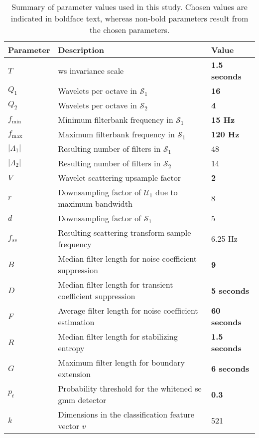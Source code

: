 {\begin{subappendices}
    \begin{table}[h]
        \caption{Summary of parameter values used in this study. Chosen values are indicated in boldface text, whereas non-bold parameters result from the chosen parameters.}
        \label{tab:parameters}
            \renewcommand{\arraystretch}{0.8}%
            \begin{tabular}{lll}  \small
                \textbf{Parameter}      & \textbf{Description} & \textbf{Value} \\ \hline
                $T$ & \ac{ws} invariance scale & \textbf{1.5 seconds} \\
                $Q_1$ & Wavelets per octave in $\mathcal{S}_1$ & \textbf{16} \\
                $Q_2$ & Wavelets per octave in $\mathcal{S}_2$ & \textbf{4} \\
                $f_\text{min}$ & Minimum filterbank frequency in $\mathcal{S}_1$ & \textbf{15 Hz}\\
                $f_\text{max}$ & Maximum filterbank frequency in $\mathcal{S}_1$ & \textbf{120 Hz}\\
                $|\Lambda_1|$ & Resulting number of filters in $\mathcal{S}_1$ & 48 \\
                $|\Lambda_2|$ & Resulting number of filters in $\mathcal{S}_2$ & 14 \\
                $V$ & Wavelet scattering upsample factor & \textbf{2} \\
                $r$ & Downsampling factor of $\mathcal{U}_1$ due to maximum bandwidth & 8 \\
                $d$ & Downsampling factor of $\mathcal{S}_1$ & 5 \\
                $f_{ss}$ & Resulting scattering transform sample frequency & 6.25 Hz \\
                $B$ & Median filter length for noise coefficient suppression & \textbf{9} \\
                $D$ & Median filter length for transient coefficient suppression  & \textbf{5 seconds} \\
                $F$ & Average filter length for noise coefficient estimation  & \textbf{60 seconds} \\
                $R$ & Median filter length for stabilizing entropy  & \textbf{1.5 seconds} \\
                $G$ & Maximum filter length for boundary extension  & \textbf{6 seconds} \\
                $p_t$ & Probability threshold for the whitened \ac{se} \ac{gmm} detector & \textbf{0.3} \\ 
                $k$ & Dimensions in the classification feature vector $v$ & 521\\ 
                \end{tabular}
                \end{table}
                

\end{subappendices}}
